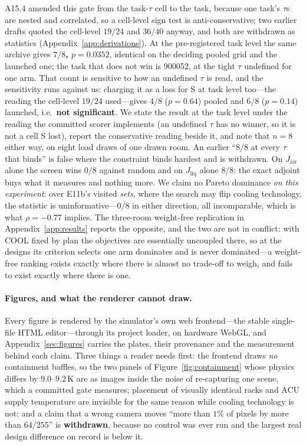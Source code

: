 \documentclass{article}
\newcommand{\Jliq}{J_{\mathrm{liq}}}
\newcommand{\Jair}{J_{\mathrm{air}}}
\begin{document}
A15.4 amended this gate from the task-$\tau$ cell to the task, because one task's $\tau$s
are nested and correlated, so a cell-level sign test is anti-conservative; two earlier drafts
quoted the cell-level $19/24$ and $36/40$ anyway, and both are withdrawn as statistics
(Appendix~\ref{app:derivations}).  At the
pre-registered task level the same archive gives \textbf{$7/8$, $p = 0.0352$}, identical
on the deciding pooled grid and the launched one; the task that does not win is 900052,
at the tight $\tau$ undefined for one arm.  That count is sensitive to how an undefined
$\tau$ is read, and the sensitivity runs against us: charging it as a loss for S at task
level too---the reading the cell-level $19/24$ used---gives $4/8$ ($p = 0.64$) pooled and
$6/8$ ($p = 0.14$) launched, i.e.\ \textbf{not significant}.  We state the result at the
task level under the reading the committed scorer implements (an undefined $\tau$ has no
winner, so it is not a cell S lost), report the conservative reading beside it, and note
that $n = 8$ either way, on eight load draws of one drawn room.  An earlier
``$8/8$ at every $\tau$ that binds'' is false where the constraint binds hardest and is withdrawn.  On $\Jair$ alone
the screen wins $0/8$ against random and on $\Jliq$ alone $8/8$: the exact adjoint buys
what it measures and nothing more.  We claim no Pareto dominance \emph{on this
experiment}: over E11b's visited \emph{sets}, where the search may flip cooling
technology, the statistic is uninformative---$0/8$ in either direction, all incomparable,
which is what $\rho = -0.77$ implies.  The three-room weight-free replication in
Appendix~\ref{app:results} reports the opposite, and the two are not in conflict: with
COOL fixed by plan the objectives are essentially uncoupled there, so at the designs its
criterion selects one arm dominates and is never dominated---a weight-free ranking exists
exactly where there is almost no trade-off to weigh, and fails to exist exactly where
there is one.



\paragraph{Figures, and what the renderer cannot draw.}
Every figure is rendered by the simulator's own web frontend---the stable single-file HTML
editor---through its project loader, on hardware WebGL, and Appendix~\ref{sec:figures}
carries the plates, their provenance and the measurement behind each claim.  Three things
a reader needs first: the frontend draws \emph{no} containment baffles, so the two panels
of Figure~\ref{fig:containment} whose physics differs by $9.0$--$9.2$\,K are as images
inside the noise of re-capturing one scene, which a committed gate measures; placement of
visually identical racks and ACU supply temperature are invisible for the same reason while
cooling technology is not; and a claim that a wrong camera moves ``more than $1\%$ of pixels
by more than $64/255$'' is \textbf{withdrawn}, because no control was ever run and the
largest real design difference on record is below it.
\end{document}
